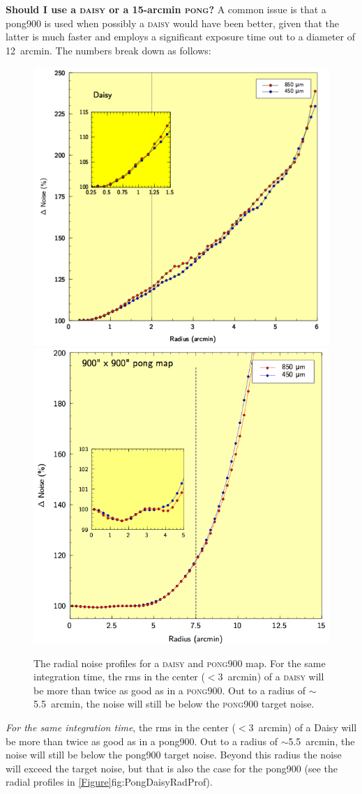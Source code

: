 \textbf{Should I use a \textsc{daisy} or a 15-arcmin \textsc{pong}?}  A 
common issue is that a pong900 is used when possibly 
a \textsc{daisy} would have been better, given that the latter is much faster and employs a significant 
exposure time out to a diameter of 12~arcmin. The numbers break down as follows:

\begin{figure}
\includegraphics[width=0.47\linewidth]{sc21_DaisyRadProf.png}
\hspace{3mm}
\includegraphics[width=0.445\linewidth]{sc21_Pong900RadProf.png}
\caption[Radial noise profiles for \textsc{Daisy} and \textsc{pong} maps.]{The
radial noise profiles for a \textsc{daisy} and \textsc{pong900} map. For the same integration time, the rms in the center ($<$3~arcmin) of a \textsc{daisy} will be more than twice as good as in a \textsc{pong900}. Out to a radius of $\sim$5.5~arcmin, the noise will still be below the \textsc{pong900} target noise.}
\label{fig:PongDaisyRadProf}
\end{figure}

\vspace{5mm}

\textit{For the same integration time}, the rms in the center ($<$3~arcmin) of a Daisy will be more than twice as good as in a pong900. Out to a radius of $\sim$5.5~arcmin, the noise will still be below the pong900 target noise. Beyond this radius the noise will exceed the target noise, but that is also the case for the pong900 (see the radial profiles in
\cref{Figure}{fig:PongDaisyRadProf}{}).

